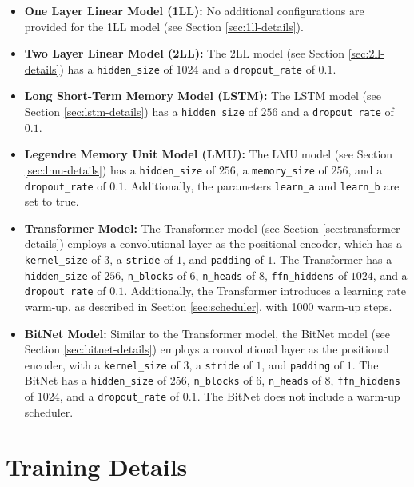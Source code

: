 \begin{itemize}
    \item \textbf{One Layer Linear Model (1LL):} 
    No additional configurations are provided for the 1LL model (see Section \ref{sec:1ll-details}).
    
    \item \textbf{Two Layer Linear Model (2LL):} 
    The 2LL model (see Section \ref{sec:2ll-details}) has a \texttt{hidden\_size} of $1024$ and a \texttt{dropout\_rate} of $0.1$.
    
    \item \textbf{Long Short-Term Memory Model (LSTM):} 
    The LSTM model (see Section \ref{sec:lstm-details}) has a \texttt{hidden\_size} of $256$ and a \texttt{dropout\_rate} of $0.1$.
    
    \item \textbf{Legendre Memory Unit Model (LMU):} 
    The LMU model (see Section \ref{sec:lmu-details}) has a \texttt{hidden\_size} of $256$, a \texttt{memory\_size} of $256$, and a \texttt{dropout\_rate} of $0.1$. Additionally, the parameters \texttt{learn\_a} and \texttt{learn\_b} are set to true.
    
    \item \textbf{Transformer Model:} 
    The Transformer model (see Section \ref{sec:transformer-details}) employs a convolutional layer as the positional encoder, which has a \texttt{kernel\_size} of $3$, a \texttt{stride} of $1$, and \texttt{padding} of $1$. The Transformer has a \texttt{hidden\_size} of $256$, \texttt{n\_blocks} of $6$, \texttt{n\_heads} of $8$, \texttt{ffn\_hiddens} of $1024$, and a \texttt{dropout\_rate} of $0.1$. Additionally, the Transformer introduces a learning rate warm-up, as described in Section \ref{sec:scheduler}, with 1000 warm-up steps.
    
    \item \textbf{BitNet Model:} 
    Similar to the Transformer model, the BitNet model (see Section \ref{sec:bitnet-details}) employs a convolutional layer as the positional encoder, with a \texttt{kernel\_size} of $3$, a \texttt{stride} of $1$, and \texttt{padding} of $1$. The BitNet has a \texttt{hidden\_size} of $256$, \texttt{n\_blocks} of $6$, \texttt{n\_heads} of $8$, \texttt{ffn\_hiddens} of $1024$, and a \texttt{dropout\_rate} of $0.1$. The BitNet does not include a warm-up scheduler.
\end{itemize}


\section{Training Details}
\label{sec:training_details}

